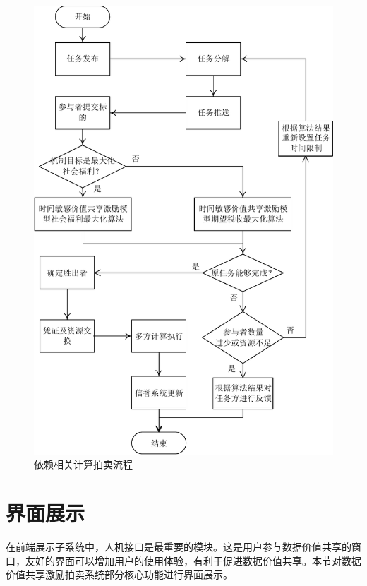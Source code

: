 \documentclass[promaster]{thesis-uestc}
\begin{document}
\begin{figure}[p]
    \includegraphics{pic/yilaixiangguan.pdf}
    \caption{依赖相关计算拍卖流程}
    \label{yilailiucheng}
\end{figure}

\FloatBarrier

\section{界面展示}

在前端展示子系统中，人机接口是最重要的模块。这是用户参与数据价值共享的窗口，友好的界面可以增加用户的使用体验，有利于促进数据价值共享。本节对数据价值共享激励拍卖系统部分核心功能进行界面展示。
\end{document}
